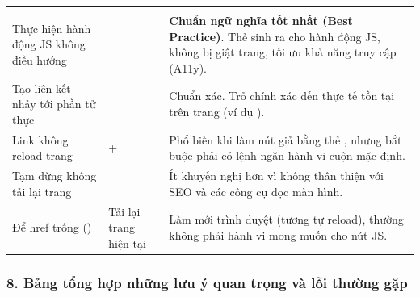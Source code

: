 \begin{prettyTableBox}[Bảng So Sánh Các Giải Pháp Thay Thế Cho href="\#"]
\begin{tabularx}{\linewidth}{C{3.0cm} L{3.5cm} Z}
 &  &  \\
Thực hiện hành động JS không điều hướng &  & \textbf{Chuẩn ngữ nghĩa tốt nhất (Best Practice)}. Thẻ  sinh ra cho hành động JS, không bị giật trang, tối ưu khả năng truy cập (A11y). \\
Tạo liên kết nhảy tới phần tử thực &  & Chuẩn xác. Trỏ chính xác đến  thực tế tồn tại trên trang (ví dụ ). \\
Link không reload trang &  +  & Phổ biến khi làm nút giả bằng thẻ , nhưng bắt buộc phải có lệnh ngăn hành vi cuộn mặc định. \\
Tạm dừng không tải lại trang &  & Ít khuyến nghị hơn vì không thân thiện với SEO và các công cụ đọc màn hình. \\
Để href trống () & Tải lại trang hiện tại & Làm mới trình duyệt (tương tự reload), thường không phải hành vi mong muốn cho nút JS. \\
\end{tabularx}
\end{prettyTableBox}

\subsubsection{8. Bảng tổng hợp những lưu ý quan trọng và lỗi thường gặp}

